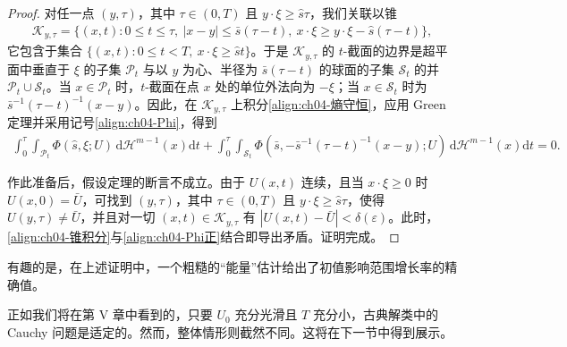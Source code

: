 ﻿\documentclass[../../main.tex]{subfiles}
\begin{document}
\begin{proof}
对任一点 $(y,\tau)$，其中 $\tau\in(0,T)$ 且 $y\cdot\xi\geqslant\hat{s}\tau$，我们关联以锥
\begin{align}
\mathscr{K}_{y,\tau}=\{(x,t):0\leqslant t\leqslant\tau,\ |x-y|\leqslant\bar{s}(\tau-t),\ x\cdot\xi\geqslant y\cdot\xi-\hat{s}(\tau-t)\},
\label{align:ch04-影响锥}
\end{align}
它包含于集合 $\{(x,t):0\leqslant t<T,\ x\cdot\xi\geqslant\hat{s}t\}$。于是 $\mathscr{K}_{y,\tau}$ 的 $t$-截面的边界是超平面中垂直于 $\xi$ 的子集 $\mathscr{P}_{t}$ 与以 $y$ 为心、半径为 $\bar{s}(\tau-t)$ 的球面的子集 $\mathscr{S}_{t}$ 的并 $\mathscr{P}_{t}\cup\mathscr{S}_{t}$。当 $x\in\mathscr{P}_{t}$ 时，$t$-截面在点 $x$ 处的单位外法向为 $-\xi$；当 $x\in\mathscr{S}_{t}$ 时为 $\bar{s}^{-1}(\tau-t)^{-1}(x-y)$。因此，在 $\mathscr{K}_{y,\tau}$ 上积分\eqref{align:ch04-熵守恒}，应用 Green 定理并采用记号\eqref{align:ch04-Phi}，得到
\begin{align}
\int_{0}^{\tau}\int_{\mathscr{P}_{t}}\Phi(\hat{s},\xi;U)\,\mathrm{d}\mathscr{H}^{m-1}(x)\mathrm{d}t+\int_{0}^{\tau}\int_{\mathscr{S}_{t}}\Phi(\bar{s},-\bar{s}^{-1}(\tau-t)^{-1}(x-y);U)\,\mathrm{d}\mathscr{H}^{m-1}(x)\mathrm{d}t=0.
\label{align:ch04-锥积分}
\end{align}

作此准备后，假设定理的断言不成立。由于 $U(x,t)$ 连续，且当 $x\cdot\xi\geqslant 0$ 时 $U(x,0)=\bar{U}$，可找到 $(y,\tau)$，其中 $\tau\in(0,T)$ 且 $y\cdot\xi\geqslant\hat{s}\tau$，使得 $U(y,\tau)\neq\bar{U}$，并且对一切 $(x,t)\in\mathscr{K}_{y,\tau}$ 有 $|U(x,t)-\bar{U}|<\delta(\varepsilon)$。此时，\eqref{align:ch04-锥积分}与\eqref{align:ch04-Phi正}结合即导出矛盾。证明完成。
\end{proof}

有趣的是，在上述证明中，一个粗糙的“能量”估计给出了初值影响范围增长率的精确值。

正如我们将在第 V 章中看到的，只要 $U_{0}$ 充分光滑且 $T$ 充分小，古典解类中的 Cauchy 问题是适定的。然而，整体情形则截然不同。这将在下一节中得到展示。
\end{document}
